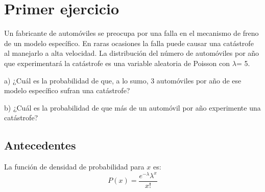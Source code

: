 \documentclass[12pt,letterpaper]{article}
\begin{document}

\tableofcontents
\newpage
\section{Primer ejercicio}
Un fabricante de automóviles se preocupa por
una falla en el mecanismo de freno de un modelo específico. En raras ocasiones la falla puede causar una
catástrofe al manejarlo a alta velocidad. La distribución
del número de automóviles por año que experimentará
la catástrofe es una variable aleatoria de Poisson con $\lambda$= 5. \par
a) ¿Cuál es la probabilidad de que, a lo sumo, 3 automóviles
por año de ese modelo específico sufran
una catástrofe?\par
b) ¿Cuál es la probabilidad de que más de un automóvil por año experimente una catástrofe?\cite{walpole}
\subsection{Antecedentes}
La función de densidad de probabilidad para $x$ es: 
\begin{equation}
    P\left( x \right) = \frac{{e^{ - \lambda } \lambda ^x }}{{x!}}
\end{equation}
\end{document}
